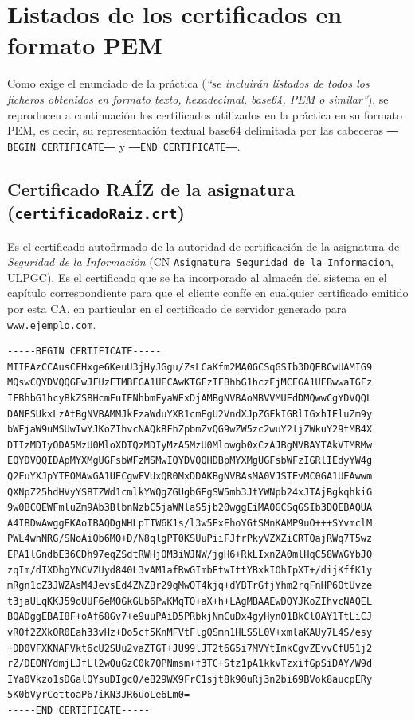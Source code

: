 \chapter{Listados de los certificados en formato PEM}
Como exige el enunciado de la práctica (\emph{``se incluirán listados de todos los ficheros obtenidos en formato texto, hexadecimal, base64, PEM o similar''}), se reproducen a continuación los certificados utilizados en la práctica en su formato PEM, es decir, su representación textual base64 delimitada por las cabeceras \texttt{-----BEGIN CERTIFICATE-----} y \texttt{-----END CERTIFICATE-----}.

\section{Certificado RAÍZ de la asignatura (\texttt{certificadoRaiz.crt})}
Es el certificado autofirmado de la autoridad de certificación de la asignatura de \emph{Seguridad de la Información} (CN \texttt{Asignatura Seguridad de la Informacion}, ULPGC). Es el certificado que se ha incorporado al almacén del sistema en el capítulo correspondiente para que el cliente confíe en cualquier certificado emitido por esta CA, en particular en el certificado de servidor generado para \texttt{www.ejemplo.com}.

\begin{lstlisting}[basicstyle=\ttfamily\scriptsize, caption={certificadoRaiz.crt en formato PEM}]
-----BEGIN CERTIFICATE-----
MIIEAzCCAusCFHxge6KeuU3jHyJGgu/ZsLCaKfm2MA0GCSqGSIb3DQEBCwUAMIG9
MQswCQYDVQQGEwJFUzETMBEGA1UECAwKTGFzIFBhbG1hczEjMCEGA1UEBwwaTGFz
IFBhbG1hcyBkZSBHcmFuIENhbmFyaWExDjAMBgNVBAoMBVVMUEdDMQwwCgYDVQQL
DANFSUkxLzAtBgNVBAMMJkFzaWduYXR1cmEgU2VndXJpZGFkIGRlIGxhIEluZm9y
bWFjaW9uMSUwIwYJKoZIhvcNAQkBFhZpbmZvQG9wZW5zc2wuY2ljZWkuY29tMB4X
DTIzMDIyODA5MzU0MloXDTQzMDIyMzA5MzU0Mlowgb0xCzAJBgNVBAYTAkVTMRMw
EQYDVQQIDApMYXMgUGFsbWFzMSMwIQYDVQQHDBpMYXMgUGFsbWFzIGRlIEdyYW4g
Q2FuYXJpYTEOMAwGA1UECgwFVUxQR0MxDDAKBgNVBAsMA0VJSTEvMC0GA1UEAwwm
QXNpZ25hdHVyYSBTZWd1cmlkYWQgZGUgbGEgSW5mb3JtYWNpb24xJTAjBgkqhkiG
9w0BCQEWFmluZm9Ab3BlbnNzbC5jaWNlaS5jb20wggEiMA0GCSqGSIb3DQEBAQUA
A4IBDwAwggEKAoIBAQDgNHLpTIW6K1s/l3w5ExEhoYGtSMnKAMP9uO+++SYvmclM
PWL4whNRG/SNoAiQb6MQ+D/N8qlgPT0KSUuPiiFJfrPkyVZXZiCRTQajRWq7T5wz
EPA1lGndbE36CDh97eqZSdtRWHjOM3iWJNW/jgH6+RkLIxnZA0mlHqC58WWGYbJQ
zqIm/dIXDhgYNCVZUyd840L3vAM1afRwGImbEtwIttYBxkIOhIpXT+/dijKffK1y
mRgn1cZ3JWZAsM4JevsEd4ZNZBr29qMwQT4kjq+dYBTrGfjYhm2rqFnHP6OtUvze
t3jaULqKKJ59oUUF6eMOGkGUb6PwKMqTO+aX+h+LAgMBAAEwDQYJKoZIhvcNAQEL
BQADggEBAI8F+oAf68Gv7+e9uuPAiD5PRbkjNmCuDx4gyHynO1BkClQAY1TtLiCJ
vROf2ZXkOR0Eah33vHz+Do5cf5KnMFVtFlgQSmn1HLSSL0V+xmlaKAUy7L4S/esy
+DD0VFXKNAFVkt6cU2SUu2vaZTGT+JU99lJT2t6G5i7MVYtImkCgvZEvvCfU51j2
rZ/DEONYdmjLJfLl2wQuGzC0k7QPNmsm+f3TC+Stz1pA1kkvTzxifGpSiDAY/W9d
IYa0Vkzo1sDGalQYsuDIgcQ/eB29WX9FrC1sjt8k90uRj3n2bi69BVok8aucpERy
5K0bVyrCettoaP67iKN3JR6uoLe6Lm0=
-----END CERTIFICATE-----
\end{lstlisting}

